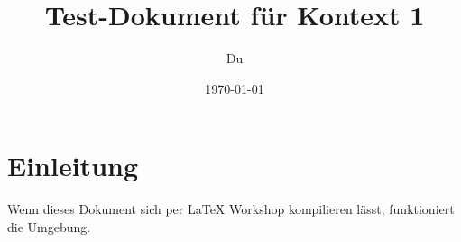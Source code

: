 \documentclass[a4paper,12pt]{article}
\title{Test-Dokument für Kontext 1}
\author{Du}
\date{\today}
\begin{document}
\maketitle

\section{Einleitung}
Wenn dieses Dokument sich per LaTeX Workshop kompilieren lässt, funktioniert die Umgebung.
\end{document}
